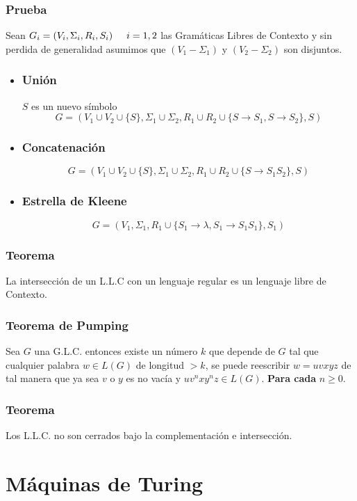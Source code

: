 \subsubsection*{Prueba}
Sean $G_i=(V_i,\Sigma_i,R_i,S_i)\hspace{0.5cm}i=1,2$ las Gramáticas Libres de Contexto y sin perdida de generalidad asumimos que $(V_1-\Sigma_1)$ y $(V_2-\Sigma_2)$ son disjuntos. 
\begin{itemize}
\item \subsubsection*{Unión}
$S$ es un nuevo símbolo
$$
G = (V_1\cup V_2 \cup \{ S\},\Sigma_1\cup\Sigma_2,R_1\cup R_2 \cup \{S\rightarrow S_1,S\rightarrow S_2 \},S )
$$
\item \subsubsection*{Concatenación}
$$
G=(V_1 \cup V_2 \cup \{ S\} ,\Sigma_1 \cup \Sigma_2,R_1 \cup R_2 \cup \{ S\rightarrow S_1 S_2 \},S )
$$
\item \subsubsection*{Estrella de Kleene}
$$
G = (V_1,\Sigma_1,R_1 \cup \{S_1\rightarrow\lambda, S_1 \rightarrow S_1 S_1 \} ,S_1)
$$
\end{itemize}
\subsubsection*{Teorema}
La intersección de un L.L.C con un lenguaje regular es un lenguaje libre de Contexto.
\subsubsection{Teorema de Pumping}
Sea $G$ una G.L.C. entonces existe un número $k$ que depende de $G$ tal que cualquier palabra $w\in L(G)$ de longitud $>k$, se puede reescribir $w=uvxyz$ de tal manera que ya sea $v$ o $y$ es no vacía y $uv^n xy^n z\in L(G)$. \textbf{Para cada} $n\geq 0$.
\subsubsection{Teorema}
Los L.L.C. no son cerrados bajo la complementación e intersección.
\section{Máquinas de Turing }
